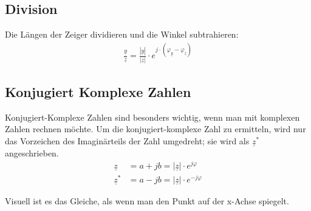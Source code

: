 \subsection{Division}
Die Längen der Zeiger dividieren und die Winkel subtrahieren:
\begin{align}
    \frac{\underline{y}}{\underline{z}}=\frac{|\underline{y}|}{|\underline{z}|}\cdot e^{j\cdot(\varphi_{\underline{y}}-\varphi_{\underline{z}})}
\end{align}

\subsection{Konjugiert Komplexe Zahlen}
Konjugiert-Komplexe Zahlen sind besonders wichtig, wenn man mit komplexen Zahlen rechnen möchte. Um die konjugiert-komplexe Zahl zu ermitteln, wird nur das Vorzeichen des Imaginärteils der Zahl umgedreht; sie wird als $\underline{z}^*$ angeschrieben.
\begin{align}
    \underline{z}&=a+jb=|\underline{z}|\cdot e^{j\varphi}       \\
    \underline{z}^*&=a-jb=|\underline{z}|\cdot e^{-j\varphi}
\end{align}

Visuell ist es das Gleiche, als wenn man den Punkt auf der x-Achse spiegelt.





\newpage

